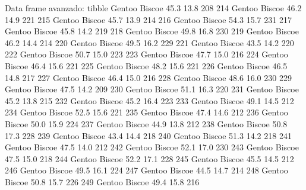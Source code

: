 \documentclass[
  ignorenonframetext,
  aspectratio=169]{beamer}
\let\oldverbatim\verbatim
\let\endoldverbatim\endverbatim
\renewenvironment{verbatim}{\tiny\oldverbatim}{\endoldverbatim}
\begin{document}
\begin{frame}[fragile]{Data frame avanzado: tibble}
\begin{verbatim}
213    Gentoo    Biscoe           45.3          13.8               208
214    Gentoo    Biscoe           46.2          14.9               221
215    Gentoo    Biscoe           45.7          13.9               214
216    Gentoo    Biscoe           54.3          15.7               231
217    Gentoo    Biscoe           45.8          14.2               219
218    Gentoo    Biscoe           49.8          16.8               230
219    Gentoo    Biscoe           46.2          14.4               214
220    Gentoo    Biscoe           49.5          16.2               229
221    Gentoo    Biscoe           43.5          14.2               220
222    Gentoo    Biscoe           50.7          15.0               223
223    Gentoo    Biscoe           47.7          15.0               216
224    Gentoo    Biscoe           46.4          15.6               221
225    Gentoo    Biscoe           48.2          15.6               221
226    Gentoo    Biscoe           46.5          14.8               217
227    Gentoo    Biscoe           46.4          15.0               216
228    Gentoo    Biscoe           48.6          16.0               230
229    Gentoo    Biscoe           47.5          14.2               209
230    Gentoo    Biscoe           51.1          16.3               220
231    Gentoo    Biscoe           45.2          13.8               215
232    Gentoo    Biscoe           45.2          16.4               223
233    Gentoo    Biscoe           49.1          14.5               212
234    Gentoo    Biscoe           52.5          15.6               221
235    Gentoo    Biscoe           47.4          14.6               212
236    Gentoo    Biscoe           50.0          15.9               224
237    Gentoo    Biscoe           44.9          13.8               212
238    Gentoo    Biscoe           50.8          17.3               228
239    Gentoo    Biscoe           43.4          14.4               218
240    Gentoo    Biscoe           51.3          14.2               218
241    Gentoo    Biscoe           47.5          14.0               212
242    Gentoo    Biscoe           52.1          17.0               230
243    Gentoo    Biscoe           47.5          15.0               218
244    Gentoo    Biscoe           52.2          17.1               228
245    Gentoo    Biscoe           45.5          14.5               212
246    Gentoo    Biscoe           49.5          16.1               224
247    Gentoo    Biscoe           44.5          14.7               214
248    Gentoo    Biscoe           50.8          15.7               226
249    Gentoo    Biscoe           49.4          15.8               216

\end{verbatim}
\end{frame}
\end{document}

